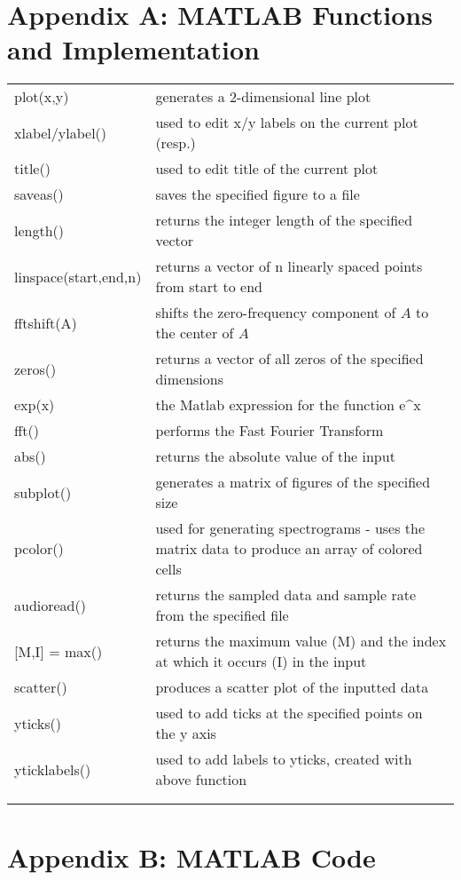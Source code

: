 \documentclass[a4paper,10 pt]{article}
\begin{document}
\section{Appendix A: MATLAB Functions and Implementation}
\begin{table}[H]
\begin{tabular}{ll}
plot(x,y) & generates a 2-dimensional line plot \\
xlabel/ylabel() & used to edit x/y labels on the current plot (resp.) \\
title() & used to edit title of the current plot \\
saveas() & saves the specified figure to a file \\
length() & returns the integer length of the specified vector \\
linspace(start,end,n) & returns a vector of n linearly spaced points from start to end \\
fftshift(A) & shifts the zero-frequency component of $A$ to the center of $A$ \\
zeros() & returns a vector of all zeros of the specified dimensions \\
exp(x) & the Matlab expression for the function e^x \\
fft() & performs the Fast Fourier Transform \\
abs() & returns the absolute value of the input \\
subplot() & generates a matrix of figures of the specified size \\
pcolor() & used for generating spectrograms - uses the matrix data to produce an array of colored cells \\
audioread() & returns the sampled data and sample rate from the specified file \\
{[}M,I{]} = max() & returns the maximum value (M) and the index at which it occurs (I) in the input \\
scatter() & produces a scatter plot of the inputted data \\
yticks() & used to add ticks at the specified points on the y axis \\
yticklabels() & used to add labels to yticks, created with above function \\
 &  \\
 & 
\end{tabular}
\end{table}
\newpage
\section{Appendix B: MATLAB Code}
\end{document}
